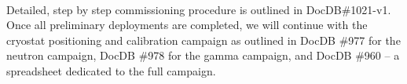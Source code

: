  \paragraph{}
  Detailed, step by step commissioning procedure is outlined in DocDB\#1021-v1. 
Once all preliminary deployments are completed, we will continue with the cryostat positioning and calibration campaign as outlined in DocDB \#977 for the neutron campaign, DocDB \#978 for the gamma campaign, and DocDB \#960 -- a spreadsheet dedicated to the full campaign.  
  



